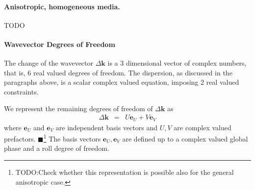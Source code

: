 \documentclass[12pt,a4paper,twoside,openright,BCOR10mm,headsepline,titlepage,abstracton,chapterprefix,final]{scrreprt}
\newcommand\Vector[1]{{\mathbf{#1}}}
\newcommand\wavenumber{k}
\newcommand\Wavevector{\Vector{\wavenumber}}
\newcommand{\remark}[1]{{\color{red}$\blacksquare$}\footnote{{\color{red}#1}}}
\begin{document}
\paragraph{Anisotropic, homogeneous media.}
TODO

\paragraph{Wavevector Degrees of Freedom}
The change of the wavevector $\Delta\Wavevector$ is a 3 dimensional vector of complex numbers, that is, 6 real valued degrees of freedom.
The dispersion, as discussed in the paragraphs above, is a scalar complex valued equation, imposing 2 real valued constraints.

We represent the remaining degrees of freedom of $\Delta \Wavevector$ as
\begin{eqnarray}
 \Delta \Wavevector &=& U \Vector{e}_U + V \Vector{e}_V
\end{eqnarray}
where $\Vector{e}_U$ and $\Vector{e}_V$ are independent basis vectors and $U,V$ are complex valued prefactors.
\remark{TODO:Check whether this representation is possible also for the general anisotropic case.}
The basis vectors $\Vector{e}_U, \Vector{e}_V$ are defined up to a complex valued global phase and a roll degree of freedom. 
\end{document}

